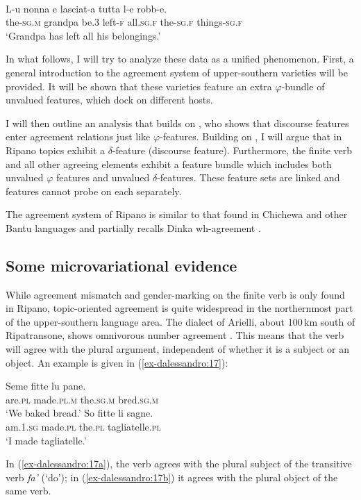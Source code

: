 \documentclass[output=paper
,modfonts
,nonflat]{langsci/langscibook}
\begin{document}
\begin{exe}
	\ex \label{ex-dalessandro:16}	\citet[140]{Rossi2008}\\
	\gll L-u   nonna   e   lasciat-a tutta   l-e   robb-e.\\
	the-\textsc{sg.m} grandpa  be.3  left-\textsc{f} all.\textsc{sg.f} the-\textsc{sg.f} things-\textsc{sg.f}\\
	\glt `Grandpa has left all his belongings.'
\end{exe}
In what follows, I will try to analyze these data as a unified phenomenon. First, a general introduction to the agreement system of upper-southern varieties will be provided. It will be shown that these varieties feature an extra $\varphi $-bundle of unvalued features, which dock on different hosts.

I will then outline an analysis that builds on \citet{Miyagawa2017}, who shows that discourse features enter agreement relations just like $\varphi$-features. Building on \citet{Miyagawa2017}, I will argue that in Ripano topics exhibit a $\delta$-feature (discourse feature). Furthermore, the finite verb and all other agreeing elements exhibit a feature bundle which includes both unvalued $\varphi $ features and unvalued $\delta$-features.  These feature sets are linked and features cannot probe on each separately. 

The agreement system of Ripano is similar to that found in Chichewa and other Bantu languages \citep{Bresnan_Mchombo1987} and partially recalls Dinka wh-agreement \citep{Van_Urk2015}.

\subsection{Some microvariational evidence} \label{sec-dalessandro:2.3}
While agreement mismatch and gender-marking on the finite verb is only found in Ripano, topic-oriented agreement is quite widespread in the northernmost part of the upper-southern language area. The dialect of Arielli, about 100\,km south of Ripatransone, shows omnivorous number agreement \citep{D`Alessandro_Roberts2010,D`Alessandro2017}. This means that the verb will agree with the plural argument, independent of whether it is a subject or an object. An example is given in (\ref{ex-dalessandro:17}):

\begin{exe} 
	\ex \label{ex-dalessandro:17} \xlist
	\ex   \label{ex-dalessandro:17a}
	\gll Seme   fitte   lu   pane.\\
	are.\textsc{pl} made.\textsc{pl.m} the.\textsc{sg.m} bred.\textsc{sg.m}\\
	\glt `We baked bread.' 
	\ex \label{ex-dalessandro:17b}
	\gll  So     fitte   li         sagne.\\ 
	am.\textsc{1.sg} made.\textsc{pl} the.\textsc{pl} tagliatelle.\textsc{pl}\\ 
	\glt `I made tagliatelle.'
	\endxlist
\end{exe}
In (\ref{ex-dalessandro:17a}), the verb agrees with the plural subject of the transitive verb \textit{fa’} (‘do’); in (\ref{ex-dalessandro:17b}) it agrees with the plural object of the same verb. 
\end{document}
